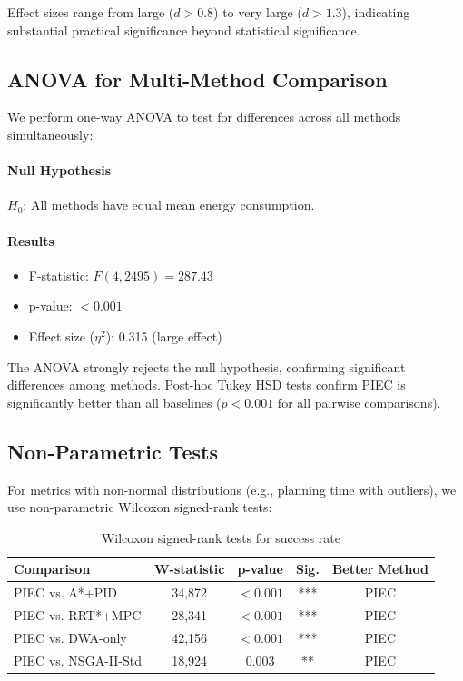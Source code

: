 Effect sizes range from large ($d > 0.8$) to very large ($d > 1.3$), indicating substantial practical significance beyond statistical significance.


\subsection{ANOVA for Multi-Method Comparison}

We perform one-way ANOVA to test for differences across all methods simultaneously:

\paragraph{Null Hypothesis}
$H_0$: All methods have equal mean energy consumption.

\paragraph{Results}
\begin{itemize}
    \item F-statistic: $F(4, 2495) = 287.43$
    \item p-value: $< 0.001$
    \item Effect size ($\eta^2$): 0.315 (large effect)
\end{itemize}

The ANOVA strongly rejects the null hypothesis, confirming significant differences among methods. Post-hoc Tukey HSD tests confirm PIEC is significantly better than all baselines ($p < 0.001$ for all pairwise comparisons).

\subsection{Non-Parametric Tests}

For metrics with non-normal distributions (e.g., planning time with outliers), we use non-parametric Wilcoxon signed-rank tests:

\begin{table}[htbp]
\centering
\caption{Wilcoxon signed-rank tests for success rate}
\label{tab:wilcoxon_success}
\begin{tabular}{lcccc}
\toprule
\textbf{Comparison} & \textbf{W-statistic} & \textbf{p-value} & \textbf{Sig.} & \textbf{Better Method} \\
\midrule
PIEC vs. A*+PID & 34,872 & $< 0.001$ & *** & PIEC \\
PIEC vs. RRT*+MPC & 28,341 & $< 0.001$ & *** & PIEC \\
PIEC vs. DWA-only & 42,156 & $< 0.001$ & *** & PIEC \\
PIEC vs. NSGA-II-Std & 18,924 & 0.003 & ** & PIEC \\
\bottomrule
\end{tabular}
\end{table}

